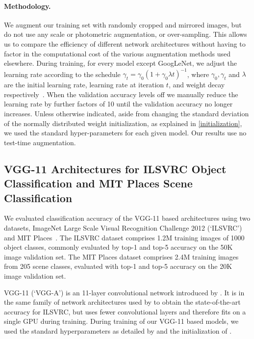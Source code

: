 \documentclass[thesis]{subfiles}
\begin{document}
    \paragraph{Methodology.} We augment our training set with randomly cropped and mirrored images, but do not use any scale or photometric augmentation, or over-sampling. This allows us to compare the efficiency of different network architectures without having to factor in the computational cost of the various augmentation methods used elsewhere. During training, for every model except GoogLeNet, we adjust the learning rate according to the schedule $\gamma_t = \gamma_0(1+\gamma_0\lambda t)^{-1}$, where $\gamma_0,\gamma_t$ and $\lambda$ are the initial learning rate, learning rate at iteration $t$, and weight decay respectively~\citep{Bottou2012sgdtricks}. When the validation accuracy levels off we manually reduce the learning rate by further factors of 10 until the validation accuracy no longer increases. Unless otherwise indicated, aside from changing the standard deviation of the normally distributed weight initialization, as explained in \cref{initialization}, we used the standard hyper-parameters for each given model. Our results use no test-time augmentation.  
    
    \subsection{VGG-11 Architectures for ILSVRC Object Classification and MIT Places Scene Classification}\label{vggresults}
    We evaluated classification accuracy of the VGG-11 based architectures using two datasets, ImageNet Large Scale Visual Recognition Challenge 2012 (`ILSVRC')~\citep{Jia2014} and MIT Places~\citep{zhou2014learning}. The ILSVRC dataset comprises 1.2M training images of 1000 object classes, commonly evaluated by top-1 and top-5 accuracy on the 50K image validation set. The MIT Places dataset comprises 2.4M training images from 205 scene classes, evaluated with top-1 and top-5 accuracy on the 20K image validation set.
    
    VGG-11 (`VGG-A') is an 11-layer convolutional network introduced by \citet{Simonyan2014verydeep}. It is in the same family of network architectures used by \citet{Simonyan2014verydeep,He2015b} to obtain the state-of-the-art accuracy for ILSVRC, but uses fewer convolutional layers and therefore fits on a single GPU during training. During training of our VGG-11 based models, we used the standard hyperparameters as detailed by \citet{Simonyan2014verydeep} and the initialization of \citet{He2015b}.
    
\end{document}
